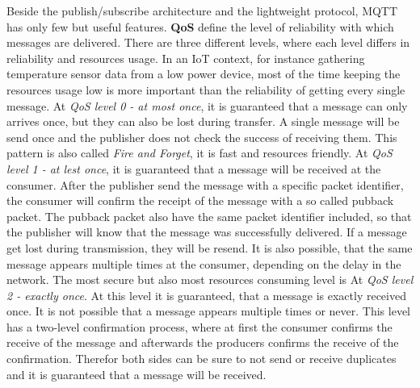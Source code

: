 Beside the publish/subscribe architecture and the lightweight protocol, \ac{MQTT} has only few but useful features.
\textbf{\ac{QoS}} define the level of reliability with which messages are delivered.\autocite[cf.]{Bayer:MQTT}
There are three different levels, where each level differs in reliability and resources usage.\autocite[cf.]{Bayer:MQTT}
In an \ac{IoT} context, for instance gathering temperature sensor data from a low power device, most of the time keeping the resources usage low is more important than the reliability of getting every single message.\newline
At \textit{\ac{QoS} level 0 - at most once}, it is guaranteed that a message can only arrives once, but they can also be lost during transfer.
A single message will be send once and the publisher does not check the success of receiving them.
This pattern is also called \textit{Fire and Forget}, it is fast and resources friendly.\autocite[cf.]{Bayer:MQTT}\newline
At \textit{\ac{QoS} level 1 - at lest once}, it is guaranteed that a message will be received at the consumer.
After the publisher send the message with a specific packet identifier, the consumer will confirm the receipt of the message with a so called pubback packet.
The pubback packet also have the same packet identifier included, so that the publisher will know that the message was successfully delivered.
If a message get lost during transmission, they will be resend.
It is also possible, that the same message appears multiple times at the consumer, depending on the delay in the network.\newline
The most secure but also most resources consuming level is At \textit{\ac{QoS} level 2 - exactly once}.
At this level it is guaranteed, that a message is exactly received once.
It is not possible that a message appears multiple times or never.
This level has a two-level confirmation process, where at first the consumer confirms the receive of the message and afterwards the producers confirms the receive of the confirmation.
Therefor both sides can be sure to not send or receive duplicates and it is guaranteed that a message will be received.

